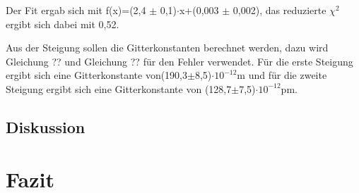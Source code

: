 \documentclass[12pt,a4paper]{article}
\begin{document}
Der Fit ergab sich mit f(x)=(2,4 $\pm$ 0,1)$\cdot$x+(0,003 $\pm$ 0,002), das reduzierte $\chi^2$ ergibt sich dabei mit 0,52.

Aus der Steigung sollen die Gitterkonstanten berechnet werden, dazu wird Gleichung ?? und Gleichung ?? für den Fehler verwendet. Für die erste Steigung ergibt sich eine Gitterkonstante von(190,3$\pm$8,5)$\cdot 10^{-12}$m und für die zweite Steigung ergibt sich eine Gitterkonstante von (128,7$\pm$7,5)$\cdot 10^{-12}$pm.

\subsection{Diskussion}
\section{Fazit}
\end{document}
